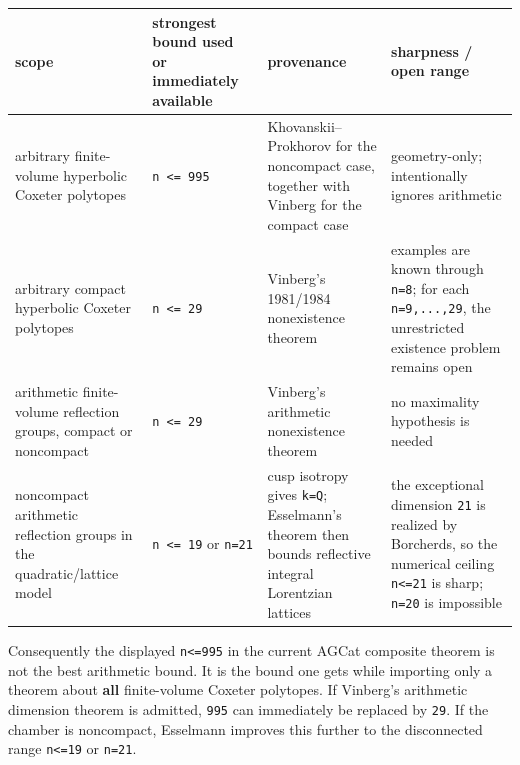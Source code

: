 \documentclass[
  10pt,
]{report}
\newcounter{none} %
\begin{document}
{\def\LTcaptype{none} %
\begin{longtable}[]{@{}
  >{\raggedright\arraybackslash}p{}
  >{\raggedleft\arraybackslash}p{}
  >{\raggedright\arraybackslash}p{}
  >{\raggedright\arraybackslash}p{}@{}}
\toprule\noalign{}
\begin{minipage}[b]{\linewidth}\raggedright
scope
\end{minipage} & \begin{minipage}[b]{\linewidth}\raggedleft
strongest bound used or immediately available
\end{minipage} & \begin{minipage}[b]{\linewidth}\raggedright
provenance
\end{minipage} & \begin{minipage}[b]{\linewidth}\raggedright
sharpness / open range
\end{minipage} \\
\midrule\noalign{}
\endhead
\bottomrule\noalign{}
\endlastfoot
arbitrary finite-volume hyperbolic Coxeter polytopes &
\texttt{n\ \textless{}=\ 995} & Khovanskii--Prokhorov for the noncompact
case, together with Vinberg for the compact case & geometry-only;
intentionally ignores arithmetic \\
arbitrary compact hyperbolic Coxeter polytopes &
\texttt{n\ \textless{}=\ 29} & Vinberg's 1981/1984 nonexistence theorem
& examples are known through \texttt{n=8}; for each \texttt{n=9,...,29},
the unrestricted existence problem remains open \\
arithmetic finite-volume reflection groups, compact or noncompact &
\texttt{n\ \textless{}=\ 29} & Vinberg's arithmetic nonexistence theorem
& no maximality hypothesis is needed \\
noncompact arithmetic reflection groups in the quadratic/lattice model &
\texttt{n\ \textless{}=\ 19} or \texttt{n=21} & cusp isotropy gives
\texttt{k=Q}; Esselmann's theorem then bounds reflective integral
Lorentzian lattices & the exceptional dimension \texttt{21} is realized
by Borcherds, so the numerical ceiling \texttt{n\textless{}=21} is
sharp; \texttt{n=20} is impossible \\
\end{longtable}
}

Consequently the displayed \texttt{n\textless{}=995} in the current
AGCat composite theorem is not the best arithmetic bound. It is the
bound one gets while importing only a theorem about \textbf{all}
finite-volume Coxeter polytopes. If Vinberg's arithmetic dimension
theorem is admitted, \texttt{995} can immediately be replaced by
\texttt{29}. If the chamber is noncompact, Esselmann improves this
further to the disconnected range \texttt{n\textless{}=19} or
\texttt{n=21}.
\end{document}
